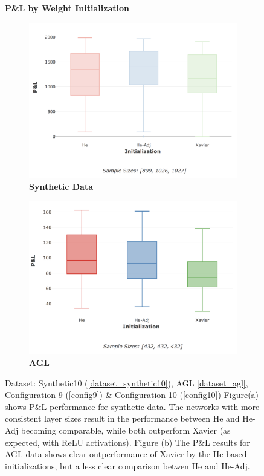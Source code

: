 \documentclass[a4paper,11pt,oneside]{article}
\theoremstyle{plain}
\theoremstyle{definition}
\begin{document}
	
	\begin{figure}[H]
		\centering
		\textbf{P\&L by Weight Initialization}
		\begin{subfigure}{.5\textwidth}
			\centering 
			\includegraphics[scale=0.28]{images/results/newinit/synth_pl_init.png}
			\caption{\textbf{Synthetic Data} 
				\newline }
			\label{figure-synthetic_pl_init}
		\end{subfigure}%
		\begin{subfigure}{.5\textwidth}
			\centering 
			\includegraphics[scale=0.28]{images/results/newinit/agl_pl_init.png}
			\caption{\textbf{AGL} 
				\newline }
			\label{figure-agl_pl_init}
		\end{subfigure}
		\caption[P\&L by Weight Initialization]{Dataset: Synthetic10 (\ref{dataset_synthetic10}), AGL \ref{dataset_agl}, Configuration 9 (\ref{config9}) \& Configuration 10 (\ref{config10})
			\newline Figure(a) shows P\&L performance for synthetic data. The networks with more consistent layer sizes result in the performance between He and He-Adj becoming comparable, while both outperform Xavier (as expected, with ReLU activations). Figure (b) The P\&L results for AGL data shows clear outperformance of Xavier by the He based initializations, but a less clear comparison betwen He and He-Adj.}
		\label{figure-pl_init}
	\end{figure}
	
\end{document}
